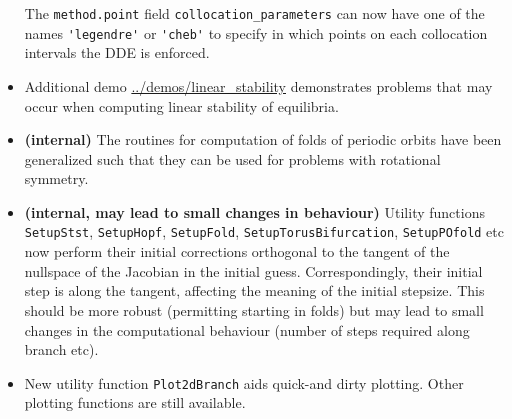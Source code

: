 \documentclass[10pt]{scrartcl}
\newcommand{\blist}[1]{\mbox{\lstinline!#1!}}
\begin{document}
\begin{itemize}
  The \blist{method.point} field \blist{collocation_parameters} can
  now have one of the names \blist{'legendre'} or \blist{'cheb'} to
  specify in which points on each collocation intervals the DDE is
  enforced.
\item Additional demo \url{../demos/linear_stability} demonstrates
  problems that may occur when computing linear stability of
  equilibria.
\item \textbf{(internal)} The routines for computation of folds of
  periodic orbits have been generalized such that they can be used for
  problems with rotational symmetry.
\item \textbf{(internal, may lead to small changes in behaviour)}
  Utility functions \blist{SetupStst}, \blist{SetupHopf},
  \blist{SetupFold}, \blist{SetupTorusBifurcation},
  \blist{SetupPOfold} etc now perform their initial corrections
  orthogonal to the tangent of the nullspace of the Jacobian in the
  initial guess. Correspondingly, their initial step is along the
  tangent, affecting the meaning of the initial stepsize. This should
  be more robust (permitting starting in folds) but may lead to small
  changes in the computational behaviour (number of steps required
  along branch etc).
\item New utility function \blist{Plot2dBranch} aids quick-and dirty
  plotting. Other plotting functions are still available.
\end{itemize}
\end{document}
